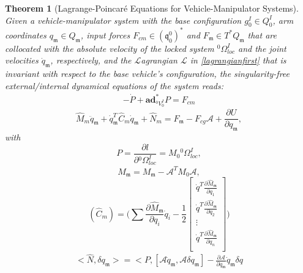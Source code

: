 \documentclass[lettersize,journal]{IEEEtran}
\def \q  {\mathfrak{q}}
\def \m  {\mathfrak{m}}
\def \L {\mathcal{L}}
\def \A {\mathcal{A}}
\def \O {{}^0\Omega^I_{loc}}
\newtheorem{theorem}{Theorem}
\theoremstyle{remark}
\begin{document}
\begin{theorem}[Lagrange-Poincar\'{e} Equations for Vehicle-Manipulator Systems] Given a vehicle-manipulator system with the base configuration $g^I_0\in Q_0^I$, arm coordinates $q_\mathfrak{m}\in Q_\m$, input forces $F_{cm}\in (\q_0^0)^*$ and $F_\mathfrak{m}\in T^*Q_\m$ that are collocated with the absolute velocity of the locked system $\O$ and the joint velocities $\dot q_\m$, respectively, and the  $\L$agrangian $\L$ in \eqref{lagrangianfirst} that is invariant with respect to the base vehicle's configuration, the singularity-free external/internal dynamical equations of the system reads: %
\begin{align}
    -\dot{P}+\textbf{ad}^*_{^0V^I_0}P=F_{cm}
    \label{euler-poincare_eq}
\end{align}
\begin{equation}
    {\hat{M}_{m}\ddot{q}_\mathfrak{m}+\dot{q}_\mathfrak{m}^T\hat{C}_{m}\dot{q}_\mathfrak{m}+\hat{N}_{m}=F_\mathfrak{m}-F_{cg}\A+\frac{\partial U}{\partial q_\m},}
\end{equation}
with
\begin{equation}
    P=\frac{\partial l}{\partial \O}=M_0 \O,%
\end{equation}
\begin{equation}
    \hat{M}_\mathfrak{m}=M_\mathfrak{m}-\A^TM_0\A,
\end{equation}
\begin{equation}
    {(\hat{C}_{m})=\bigg(\sum\frac{\partial \hat{M}_\mathfrak{m}}{\partial{q}_i}\dot{q}_i-\frac{1}{2}\begin{bmatrix}\dot{q}^T\frac{\partial \hat{M}_\mathfrak{m}}{\partial q_1}\\\dot{q}^T\frac{\partial \hat{M}_\mathfrak{m}}{\partial q_2}\\ \vdots\\\dot{q}^T\frac{\partial \hat{M}_\mathfrak{m}}{\partial q_n}\\\end{bmatrix}\bigg)}
\end{equation}
\begin{multline}
    <\hat{N},\delta q_\mathfrak{m}>=<P,[\A\dot{q}_\mathfrak{m},\A\delta q_\mathfrak{m}]-\frac{\partial \A}{\partial q_\mathfrak{m}}\dot{q}_\mathfrak{m}\delta q\\

\end{multline}
\end{theorem}
\end{document}
